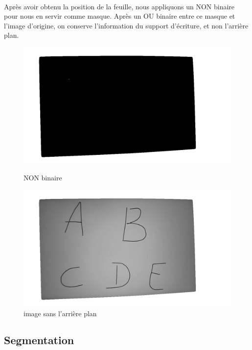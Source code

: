 \documentclass[a4paper]{article}
\begin{document}
				\paragraph{} Après avoir obtenu la position de la feuille, nous appliquons un NON binaire pour nous en servir comme masque. Après un OU binaire entre ce masque et l'image d'origine, on conserve l'information du support d'écriture, et non l'arrière plan.



				\begin{figure}[h!]
					\centering
					\begin{minipage}{.5\textwidth}
					  \centering
					  \includegraphics[width=.8\linewidth]{nonBinaireOtsu.png}
					  \caption{NON binaire}
					  \label{fig:nonBinaireOtsu}
					\end{minipage}%
					\begin{minipage}{.5\textwidth}
					  \centering
					  \includegraphics[width=.8\linewidth]{imageSansFond.png}
					  \caption{image sans l'arrière plan}
					  \label{fig:imageSansFond}
					\end{minipage}
				\end{figure}


				
			

			\subsection{Segmentation} 
\end{document}
